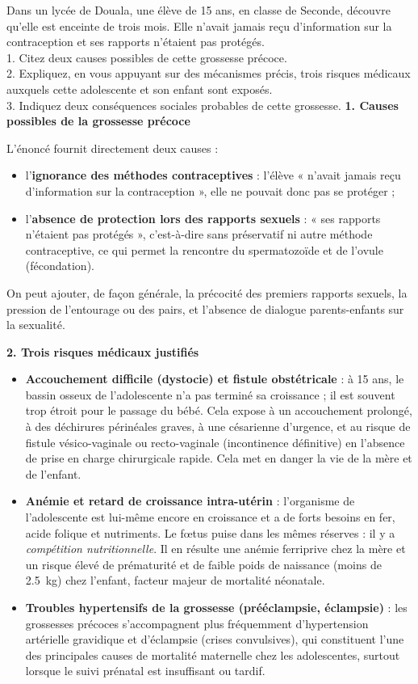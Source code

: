 \documentclass[11pt]{article}
\begin{document}
\begin{exoresolu}
Dans un lycée de Douala, une élève de 15 ans, en classe de Seconde, découvre qu'elle est enceinte de trois mois. Elle n'avait jamais reçu d'information sur la contraception et ses rapports n'étaient pas protégés.\\
1. Citez deux causes possibles de cette grossesse précoce.\\
2. Expliquez, en vous appuyant sur des mécanismes précis, trois risques médicaux auxquels cette adolescente et son enfant sont exposés.\\
3. Indiquez deux conséquences sociales probables de cette grossesse.
\tcblower
\textbf{1. Causes possibles de la grossesse précoce}

L'énoncé fournit directement deux causes :
\begin{itemize}
\item l'\textbf{ignorance des méthodes contraceptives} : l'élève « n'avait jamais reçu d'information sur la contraception », elle ne pouvait donc pas se protéger ;
\item l'\textbf{absence de protection lors des rapports sexuels} : « ses rapports n'étaient pas protégés », c'est-à-dire sans préservatif ni autre méthode contraceptive, ce qui permet la rencontre du spermatozoïde et de l'ovule (fécondation).
\end{itemize}
On peut ajouter, de façon générale, la précocité des premiers rapports sexuels, la pression de l'entourage ou des pairs, et l'absence de dialogue parents-enfants sur la sexualité.

\textbf{2. Trois risques médicaux justifiés}

\begin{itemize}
\item \textbf{Accouchement difficile (dystocie) et fistule obstétricale} : à 15 ans, le bassin osseux de l'adolescente n'a pas terminé sa croissance ; il est souvent trop étroit pour le passage du bébé. Cela expose à un accouchement prolongé, à des déchirures périnéales graves, à une césarienne d'urgence, et au risque de fistule vésico-vaginale ou recto-vaginale (incontinence définitive) en l'absence de prise en charge chirurgicale rapide. Cela met en danger la vie de la mère et de l'enfant.
\item \textbf{Anémie et retard de croissance intra-utérin} : l'organisme de l'adolescente est lui-même encore en croissance et a de forts besoins en fer, acide folique et nutriments. Le fœtus puise dans les mêmes réserves : il y a \emph{compétition nutritionnelle}. Il en résulte une anémie ferriprive chez la mère et un risque élevé de prématurité et de faible poids de naissance (moins de \SI{2,5}{kg}) chez l'enfant, facteur majeur de mortalité néonatale.
\item \textbf{Troubles hypertensifs de la grossesse (prééclampsie, éclampsie)} : les grossesses précoces s'accompagnent plus fréquemment d'hypertension artérielle gravidique et d'éclampsie (crises convulsives), qui constituent l'une des principales causes de mortalité maternelle chez les adolescentes, surtout lorsque le suivi prénatal est insuffisant ou tardif.
\end{itemize}


\end{exoresolu}
\end{document}
